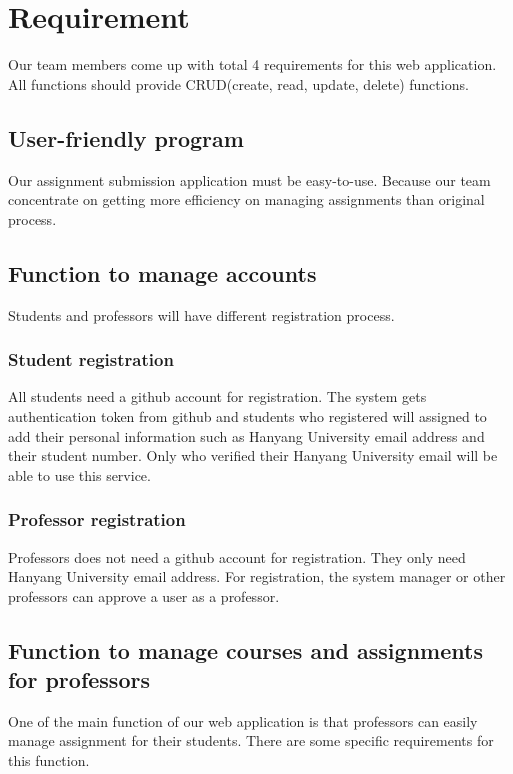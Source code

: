 \documentclass[10pt,journal,compsoc]{IEEEtran}
\begin{document}
\hfill 
 
\hfill 

\IEEEpeerreviewmaketitle

\ifCLASSOPTIONcompsoc
{}
\else
\section{Requirement}
\label{sec:Requirement}
\fi

Our team members come up with total 4 requirements for this web application. All functions should provide CRUD(create, read, update, delete) functions.

\subsection{User-friendly program}
Our assignment submission application must be easy-to-use. Because our team concentrate on getting more efficiency on managing assignments than original process. 

\subsection{Function to manage accounts}
Students and professors will have different registration process.

\subsubsection{Student registration}
All students need a github account for registration. The system gets authentication token from github and students who registered will assigned to add their personal information such as Hanyang University email address and their student number. Only who verified their Hanyang University email will be able to use this service.
\subsubsection{Professor registration}
Professors does not need a github account for registration. They only need Hanyang University email address. For registration, the system manager or other professors can approve a user as a professor.

\subsection{Function to manage courses and assignments for professors}
One of the main function of our web application is that professors can easily manage assignment for their students. There are some specific requirements for this function.
\end{document}
